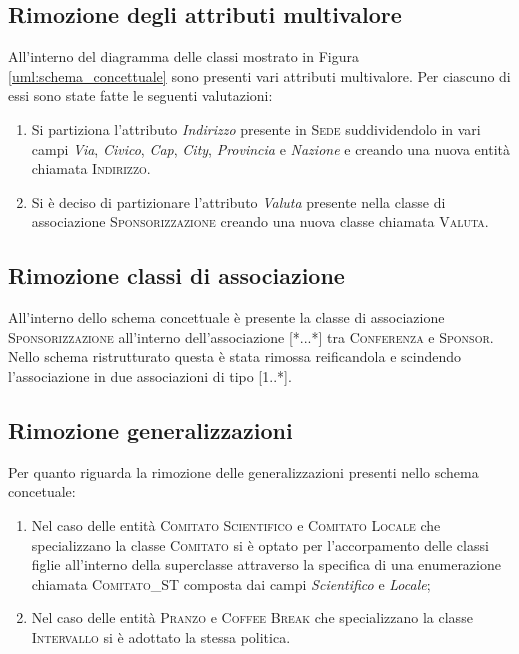 \subsection{Rimozione degli attributi multivalore}All'interno del diagramma delle classi mostrato in Figura \ref{uml:schema_concettuale} sono presenti vari attributi multivalore. Per ciascuno di essi sono state fatte le seguenti valutazioni:
\begin{enumerate}
	\item Si partiziona l'attributo \textit{Indirizzo} presente in \textsc{Sede} suddividendolo in vari campi \textit{Via}, \textit{Civico}, \textit{Cap}, \textit{City}, \textit{Provincia} e \textit{Nazione} e creando una nuova entità chiamata \textsc{Indirizzo}.
	\item Si è deciso di partizionare l'attributo \textit{Valuta} presente nella classe di associazione \textsc{Sponsorizzazione} creando una nuova classe chiamata \textsc{Valuta}.
\end{enumerate}
\subsection{Rimozione classi di associazione}
All'interno dello schema concettuale è presente la classe di associazione \textsc{Sponsorizzazione} all'interno dell'associazione [*...*] tra \textsc{Conferenza} e \textsc{Sponsor}. Nello schema ristrutturato questa è stata rimossa reificandola e scindendo l'associazione in due associazioni di tipo [1..*].
\subsection{Rimozione generalizzazioni}
Per quanto riguarda la rimozione delle generalizzazioni presenti nello schema concetuale:
\begin{enumerate}
	\item Nel caso delle entità \textsc{Comitato Scientifico} e \textsc{Comitato Locale} che specializzano la classe \textsc{Comitato} si è optato per l'accorpamento delle classi figlie all'interno della superclasse attraverso la specifica di una enumerazione chiamata \textsc{Comitato\_ST} composta dai campi \textit{Scientifico} e \textit{Locale};
	\item Nel caso delle entità \textsc{Pranzo} e \textsc{Coffee Break} che specializzano la classe \textsc{Intervallo} si è adottato la stessa politica.
\end{enumerate}
